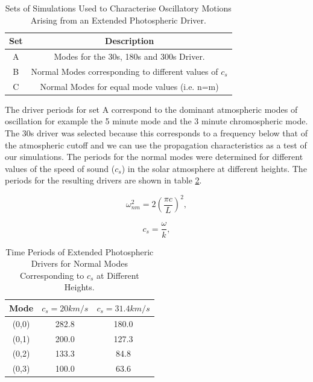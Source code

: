\documentclass[final,1p]{elsarticle}
\begin{document}
\begin{table}\label{simsetstab}
\centering
\begin{tabular}{c c }
\hline
Set   &  Description\\
\hline
A &  Modes for the 30s, 180s and 300s Driver. \\
\hline
B &  Normal Modes corresponding to different values of $c_s$ \\
\hline
C & Normal Modes for equal mode values (i.e. n=m)  \\
\hline
\end{tabular} 
\caption{Sets of Simulations Used to Characterise Oscillatory Motions Arising from an Extended Photospheric Driver.}
\end{table}

The driver periods for set A correspond to the dominant atmospheric modes of oscillation for example the 5 minute mode and the 3 minute chromospheric mode. The 30s driver was selected because this corresponds to a frequency below that of the atmospheric cutoff and we can use the propagation characteristics as a test of our simulations. The periods for the normal modes were determined for different values of the speed of sound ($c_s$) in the solar atmosphere at different heights. The periods for the resulting drivers are shown in table \ref{simperiods}.

\begin{equation}\label{normmodedrvfreq}
\omega_{nm}^{2}= 2\left(   \frac{\pi c}{L} \right) ^{2},
\end{equation}

\begin{equation}\label{normmodecs}
c_s= \frac{\omega}{k},
\end{equation}

\begin{table}\label{simperiods}
\centering
\begin{tabular}{c c c }
\hline
Mode   &  $c_s=20km/s$ &  $c_s=31.4km/s$ \\
\hline
(0,0) & 282.8 & 180.0 \\
\hline
(0,1) & 200.0 & 127.3  \\
\hline
(0,2) & 133.3 & 84.8  \\
\hline
(0,3) & 100.0 & 63.6  \\
\hline
\end{tabular} 
\caption{Time Periods of Extended Photospheric Drivers for Normal Modes Corresponding to $c_s$ at Different Heights.}
\end{table}
\end{document}
